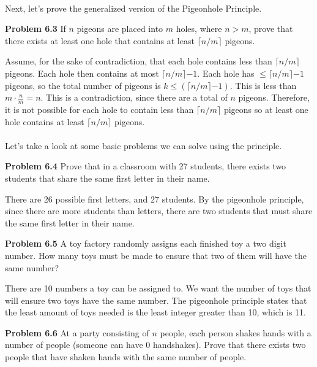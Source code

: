 \documentclass[11pt]{scrartcl}
\DeclarePairedDelimiter
\begin{document}
\\
\noindent
Next, let's prove the generalized version of the Pigeonhole Principle. 
\begin{tcolorbox}
\textbf{Problem 6.3} If $n$ pigeons are placed into $m$ holes, where $n>m$, prove that there exists at least one hole that contains at least $\lceil{n/m}\rceil$ pigeons. 
\end{tcolorbox}
\noindent
Assume, for the sake of contradiction, that each hole contains less than $\lceil{n/m}\rceil$ pigeons. Each hole then contains at most $\lceil{n/m}\rceil {-1}$. Each hole has $\leq \lceil{n/m}\rceil {-1}$ pigeons, so the total number of pigeons is $k\leq (\lceil{n/m}\rceil {-1})$. This is less than $m \cdot \frac{n}{m}{=}n$. This is a contradiction, since there are a total of $n$ pigeons. Therefore, it is not possible for each hole to contain less than $\lceil{n/m}\rceil$ pigeons so at least one hole contains at least $\lceil{n/m}\rceil$ pigeons. \\
\\  
\noindent 
Let's take a look at some basic problems we can solve using the principle. 
\\
\begin{tcolorbox}
\textbf{Problem 6.4} Prove that in a classroom with 27 students, there exists two students that share the same first letter in their name.
\end{tcolorbox}
\noindent
There are 26 possible first letters, and 27 students. By the pigeonhole principle, since there are more students than letters, there are two students that must share the same first letter in their name. 
\\
\begin{tcolorbox}
\textbf{Problem 6.5} A toy factory randomly assigns each finished toy a two digit number. How many toys must be made to ensure that two of them will have the same number?
\end{tcolorbox}
\noindent
There are 10 numbers a toy can be assigned to. We want the number of toys that will ensure two toys have the same number. The pigeonhole principle states that the least amount of toys needed is the least integer greater than 10, which is 11. 
\\
\begin{tcolorbox}
\textbf{Problem 6.6} At a party consisting of $n$ people, each person shakes hands with a number of people (someone can have 0 handshakes). Prove that there exists two people that have shaken hands with the same number of people. 
\end{tcolorbox}
\end{document}
